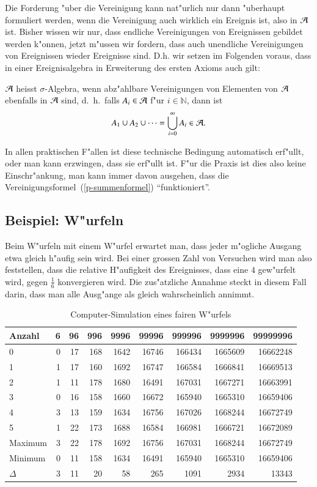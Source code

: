 Die Forderung "uber die Vereinigung kann nat"urlich nur dann "uberhaupt
formuliert werden, wenn die Vereinigung auch wirklich ein Ereignis ist, also in
$\cal A$ ist.
Bisher wissen wir nur, dass endliche
Vereinigungen von Ereignissen gebildet werden k"onnen, jetzt m"ussen
wir fordern, dass
auch unendliche Vereinigungen von Ereignissen wieder Ereignisse sind.
D.h. wir setzen im Folgenden voraus, dass in einer
Ereignisalgebra in Erweiterung des ersten Axioms auch gilt:

\begin{definition}
$\cal A$ heisst 
$\sigma$-Algebra, wenn 
abz"ahlbare Vereinigungen von Elementen von $\cal A$ ebenfalls
in $\cal A$ sind, d.~h.~falls $A_i\in{\cal A}$ f"ur $i\in\mathbb{N}$, dann ist
\[
A_1\cup A_2\cup\dots=\bigcup_{i=0}^{\infty}A_i \in{\cal A}.
\]
\end{definition}

In allen praktischen F"allen ist diese technische Bedingung automatisch
erf"ullt, oder man kann erzwingen, dass sie erf"ullt ist.
F"ur die Praxis ist dies also keine Einschr"ankung, man kann immer davon
ausgehen, dass die Vereinigungsformel~(\ref{p-summenformel}) ``funktioniert''.

\subsection{Beispiel: W"urfeln}
Beim W"urfeln mit einem W"urfel erwartet man, dass jeder m"ogliche
Ausgang etwa gleich h"aufig sein wird. Bei einer grossen Zahl von
Versuchen wird man also feststellen, dass die relative H"aufigkeit
des Ereignisses, dass eine $4$ gew"urfelt wird, gegen $\frac16$
konvergieren wird. Die zus"atzliche Annahme steckt in diesem Fall
darin, dass man alle Ausg"ange als gleich wahrscheinlich annimmt.

\begin{table}
\begin{center}
\begin{tabular}{|l|r|r|r|r|r|r|r|r|}
\hline
Anzahl&6&96&996&9996&99996&999996&9999996&99999996\\
\hline
0& 0& 17& 168& 1642& 16746& 166434& 1665609& 16662248\\
1& 1& 17& 160& 1692& 16747& 166584& 1666841& 16669513\\
2& 1& 11& 178& 1680& 16491& 167031& 1667271& 16663991\\
3& 0& 16& 158& 1660& 16672& 165940& 1665310& 16659406\\
4& 3& 13& 159& 1634& 16756& 167026& 1668244& 16672749\\
5& 1& 22& 173& 1688& 16584& 166981& 1666721& 16672089\\
\hline
Maximum& 3& 22& 178& 1692& 16756& 167031& 1668244& 16672749\\
Minimum& 0& 11& 158& 1634& 16491& 165940& 1665310& 16659406\\
$\Delta$& 3& 11& 20& 58& 265& 1091& 2934& 13343\\
\hline
\end{tabular}
\end{center}
\caption{Computer-Simulation eines fairen W"urfels\label{wuerfel-simulation}}
\end{table}


